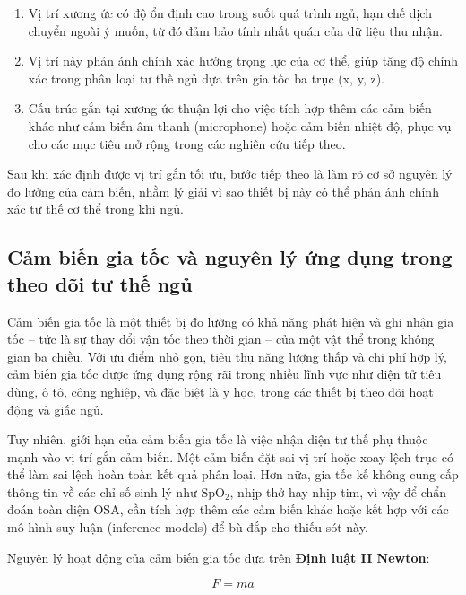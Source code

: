 \begin{enumerate}
    \item Vị trí xương ức có độ ổn định cao trong suốt quá trình ngủ, 
		hạn chế dịch chuyển ngoài ý muốn, từ đó đảm bảo tính nhất quán của 
		dữ liệu thu nhận.
    \item Vị trí này phản ánh chính xác hướng trọng lực của cơ thể, 
		giúp tăng độ chính xác trong phân loại tư thế ngủ dựa trên gia 
		tốc ba trục (x, y, z).
    \item Cấu trúc gắn tại xương ức thuận lợi cho việc tích hợp thêm 
		các cảm biến khác như cảm biến âm thanh (microphone) hoặc cảm biến 
		nhiệt độ, phục vụ cho các mục tiêu mở rộng trong các nghiên cứu 
		tiếp theo.
\end{enumerate}

Sau khi xác định được vị trí gắn tối ưu, bước tiếp theo là làm rõ cơ sở nguyên lý đo lường của cảm biến, nhằm lý giải vì sao thiết bị này có thể phản ánh chính xác tư thế cơ thể trong khi ngủ.



\subsection*{Cảm biến gia tốc và nguyên lý ứng dụng trong theo dõi tư thế ngủ}

Cảm biến gia tốc là một thiết bị đo lường có khả năng phát hiện 
và ghi nhận gia tốc – tức là sự thay đổi vận tốc theo thời gian – 
của một vật thể trong không gian ba chiều. 
Với ưu điểm nhỏ gọn, tiêu thụ năng lượng thấp và chi phí hợp lý, 
cảm biến gia tốc được ứng dụng rộng rãi trong nhiều lĩnh vực 
như điện tử tiêu dùng, ô tô, công nghiệp, và đặc biệt là y học, 
trong các thiết bị theo dõi hoạt động và giấc ngủ.

Tuy nhiên, giới hạn của cảm biến gia tốc là việc nhận diện tư thế phụ 
thuộc mạnh vào vị trí gắn cảm biến. Một cảm biến đặt sai vị trí hoặc 
xoay lệch trục có thể làm sai lệch hoàn toàn kết quả phân loại. 
Hơn nữa, gia tốc kế không cung cấp thông tin về các chỉ số sinh lý 
như $\mathrm{SpO_2}$, nhịp thở hay nhịp tim, vì vậy để chẩn đoán toàn diện OSA, 
cần tích hợp thêm các cảm biến khác hoặc kết hợp với các mô hình 
suy luận (inference models) để bù đắp cho thiếu sót này.

Nguyên lý hoạt động của cảm biến gia tốc dựa trên 
\textbf{Định luật II Newton}:

\begin{equation}
F = ma
\end{equation}

